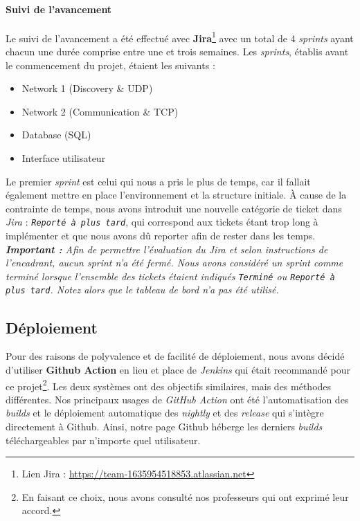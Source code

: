 \documentclass[12pt, a4paper]{article}
\begin{document}
    \paragraph{Suivi de l'avancement}
    Le suivi de l'avancement a été effectué avec \textbf{Jira}\footnote{Lien Jira : \url{https://team-1635954518853.atlassian.net}} avec un total de 4 \textit{sprints} ayant chacun une durée comprise entre une et trois semaines. Les \textit{sprints}, établis avant le commencement du projet, étaient les suivants :
    \begin{itemize}
    \item Network 1 (Discovery \& UDP) 
    \item Network 2 (Communication \& TCP)
    \item Database (SQL)
    \item Interface utilisateur
    \end{itemize}
    Le premier \textit{sprint} est celui qui nous a pris le plus de temps, car il fallait également mettre en place l'environnement et la structure initiale. À cause de la contrainte de temps, nous avons introduit une nouvelle catégorie de ticket dans \textit{Jira} : \textit{\texttt{Reporté à plus tard}}, qui correspond aux tickets étant trop long à implémenter et que nous avons dû reporter afin de rester dans les temps.\\
    
    \textit{\textbf{Important :} Afin de permettre l'évaluation du Jira et selon instructions de l'encadrant, aucun sprint n'a été fermé. Nous avons considéré un sprint comme terminé lorsque l'ensemble des tickets étaient indiqués \texttt{Terminé} ou \texttt{Reporté à plus tard}. Notez alors que le tableau de bord n'a pas été utilisé.}
    
    \subsection{Déploiement}
    Pour des raisons de polyvalence et de facilité de déploiement, nous avons décidé d'utiliser \textbf{Github Action} en lieu et place de \textit{Jenkins} qui était recommandé pour ce projet\footnote{En faisant ce choix, nous avons consulté nos professeurs qui ont exprimé leur accord.}. Les deux systèmes ont des objectifs similaires, mais des méthodes différentes. Nos principaux usages de \textit{GitHub Action} ont été l'automatisation des \textit{builds} et le déploiement automatique des \textit{nightly} et des \textit{release} qui s'intègre directement à Github. Ainsi, notre page Github héberge les derniers \textit{builds} téléchargeables par n'importe quel utilisateur.\\
    
\end{document}
